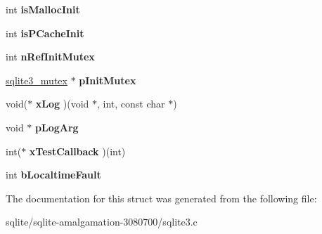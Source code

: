 \begin{DoxyCompactItemize}
\item 
\hypertarget{struct_sqlite3_config_ab0ec050075ee245df0a54623b0073bfc}{int {\bfseries is\+Malloc\+Init}}\label{struct_sqlite3_config_ab0ec050075ee245df0a54623b0073bfc}

\item 
\hypertarget{struct_sqlite3_config_a945ec3af8fd8f2efaccec88e2597393b}{int {\bfseries is\+P\+Cache\+Init}}\label{struct_sqlite3_config_a945ec3af8fd8f2efaccec88e2597393b}

\item 
\hypertarget{struct_sqlite3_config_a423f5c1b3f68d9c569661a542ebe7220}{int {\bfseries n\+Ref\+Init\+Mutex}}\label{struct_sqlite3_config_a423f5c1b3f68d9c569661a542ebe7220}

\item 
\hypertarget{struct_sqlite3_config_af8ffb8388972c384840dd36beca35e7e}{\hyperlink{structsqlite3__mutex}{sqlite3\+\_\+mutex} $\ast$ {\bfseries p\+Init\+Mutex}}\label{struct_sqlite3_config_af8ffb8388972c384840dd36beca35e7e}

\item 
\hypertarget{struct_sqlite3_config_a59bd59da6676dc62f9acdd6ff6d27d82}{void($\ast$ {\bfseries x\+Log} )(void $\ast$, int, const char $\ast$)}\label{struct_sqlite3_config_a59bd59da6676dc62f9acdd6ff6d27d82}

\item 
\hypertarget{struct_sqlite3_config_a501ab4552bc7c54bb413aced5889dcdc}{void $\ast$ {\bfseries p\+Log\+Arg}}\label{struct_sqlite3_config_a501ab4552bc7c54bb413aced5889dcdc}

\item 
\hypertarget{struct_sqlite3_config_aac31de530b66cc7fdaaf7ee9c5634994}{int($\ast$ {\bfseries x\+Test\+Callback} )(int)}\label{struct_sqlite3_config_aac31de530b66cc7fdaaf7ee9c5634994}

\item 
\hypertarget{struct_sqlite3_config_a7bdc3109ecd839317f722b5da5339fab}{int {\bfseries b\+Localtime\+Fault}}\label{struct_sqlite3_config_a7bdc3109ecd839317f722b5da5339fab}

\end{DoxyCompactItemize}


The documentation for this struct was generated from the following file\+:\begin{DoxyCompactItemize}
\item 
sqlite/sqlite-\/amalgamation-\/3080700/sqlite3.\+c\end{DoxyCompactItemize}
